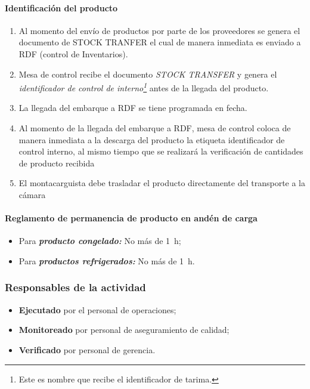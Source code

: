 \paragraph{Identificación del producto}

\begin{enumerate}
	\item Al momento del envío de productos por parte de los proveedores se genera el documento de STOCK TRANFER el cual de manera inmediata es enviado a \gls{RDF} (control de Inventarios).
	\item Mesa de control recibe el documento \textit{STOCK TRANSFER} y genera el \emph{identificador de control de interno\footnote{Este es nombre que recibe el identificador de tarima.}} antes de la llegada del producto.
	\item La llegada del embarque a \gls{RDF} se tiene programada en fecha.
	\item Al momento de la llegada del embarque a \gls{RDF}, mesa de control coloca de manera inmediata a la descarga del producto la etiqueta identificador de control interno, al mismo tiempo que se realizará la verificación de cantidades de producto recibida
	\item El montacarguista debe trasladar el producto directamente del transporte a la cámara
\end{enumerate}

\paragraph{Reglamento de permanencia de producto en andén de carga}

\begin{itemize}
	\item Para \emph{\textbf{producto congelado:}} No más de \qty{1}{\hour};
	\item Para \emph{\textbf{productos refrigerados:}} No más de \qty{1}{\hour}.
\end{itemize}


\subsubsection{Responsables de la actividad}

\begin{itemize}
	\item \textbf{Ejecutado} por el personal de operaciones;
	\item \textbf{Monitoreado} por personal de aseguramiento de calidad;
	\item \textbf{Verificado} por personal de gerencia.
\end{itemize}

